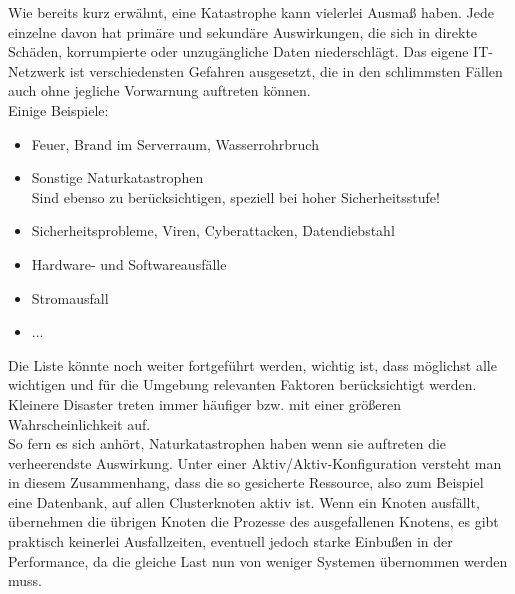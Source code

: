 \documentclass[letterpaper, 12pt]{article}
\begin{document}
Wie bereits kurz erwähnt, eine Katastrophe kann vielerlei Ausmaß haben. Jede einzelne davon hat primäre und sekundäre Auswirkungen, die sich in direkte Schäden, korrumpierte oder unzugängliche Daten niederschlägt. Das eigene IT-Netzwerk ist verschiedensten Gefahren ausgesetzt, die in den schlimmsten Fällen auch ohne jegliche Vorwarnung auftreten können. \\
Einige Beispiele:

\begin{itemize}
	\item Feuer, Brand im Serverraum, Wasserrohrbruch
	\item Sonstige Naturkatastrophen \\ Sind ebenso zu berücksichtigen, speziell bei hoher Sicherheitsstufe!
	\item Sicherheitsprobleme, Viren, Cyberattacken, Datendiebstahl
	\item Hardware- und Softwareausfälle
	\item Stromausfall
	\item ...
\end{itemize}

Die Liste könnte noch weiter fortgeführt werden, wichtig ist, dass möglichst alle wichtigen und für die Umgebung relevanten Faktoren berücksichtigt werden. Kleinere Disaster treten immer häufiger bzw. mit einer größeren Wahrscheinlichkeit auf. \\
So fern es sich anhört, Naturkatastrophen haben wenn sie auftreten die verheerendste Auswirkung. Unter einer Aktiv/Aktiv-Konfiguration versteht man in diesem Zusammenhang, dass die so gesicherte Ressource, also zum Beispiel eine Datenbank, auf allen Clusterknoten aktiv ist. Wenn ein Knoten ausfällt, übernehmen die übrigen Knoten die Prozesse des ausgefallenen Knotens, es gibt praktisch keinerlei Ausfallzeiten, eventuell jedoch starke Einbußen in der Performance, da die gleiche Last nun von weniger Systemen übernommen werden muss.
\end{document}
